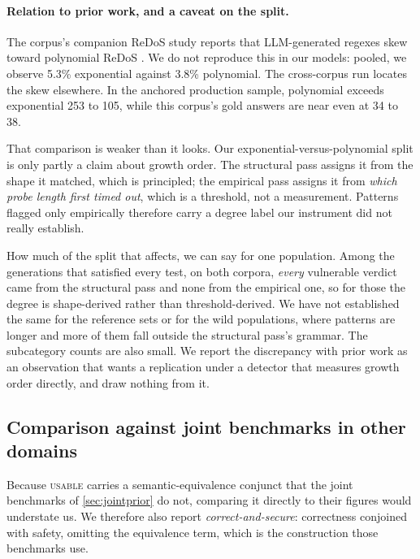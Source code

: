 \documentclass[11pt]{article}
\newcommand{\usable}{\textsc{usable}}
\begin{document}
\paragraph{Relation to prior work, and a caveat on the split.}
The corpus's companion ReDoS study reports that LLM-generated regexes skew
toward polynomial ReDoS \citep{siddiq2024redos}. We do not reproduce this in our models: pooled, we observe
5.3\% exponential against 3.8\% polynomial. The cross-corpus run locates the
skew elsewhere. In the anchored production sample, polynomial exceeds
exponential 253 to 105, while this corpus's gold answers are near even at 34
to 38.

That comparison is weaker than it looks. Our
exponential-versus-polynomial split is only partly a
claim about growth order. The structural pass assigns it from the shape it
matched, which is principled; the empirical pass assigns it from \emph{which
probe length first timed out}, which is a threshold, not a measurement.
Patterns flagged only empirically therefore carry a degree label our
instrument did not really establish.

How much of the split that affects, we can say for one population. Among the
generations that satisfied every test, on both corpora, \emph{every} vulnerable
verdict came from the structural pass and none from the empirical one, so for
those the degree is shape-derived rather than threshold-derived. We have not
established the same for the reference sets or for the wild populations, where
patterns are longer and more of them fall outside the structural pass's
grammar. The subcategory counts are also small. We report the discrepancy with
prior work as an observation that wants a replication under a detector that
measures growth order directly, and draw nothing from it.

\subsection{Comparison against joint benchmarks in other domains}
\label{sec:crossbench}

Because \usable{} carries a semantic-equivalence conjunct that the joint
benchmarks of \cref{sec:jointprior} do not, comparing it directly to their
figures would understate us. We therefore also report
\emph{correct-and-secure}: correctness conjoined with safety, omitting the
equivalence term, which is the construction those benchmarks use.

\begin{table}[htbp]
\centering
\footnotesize
\setlength{\tabcolsep}{4pt}

\caption{Our correct-and-secure rate against joint correctness-security
results from other domains. Task types, vulnerability classes and evaluation
methods all differ substantially. The comparison is one of magnitude and of
the ratio between functional and joint success, not of models or difficulty.}
\label{tab:crossbench}
\end{table}
\end{document}
